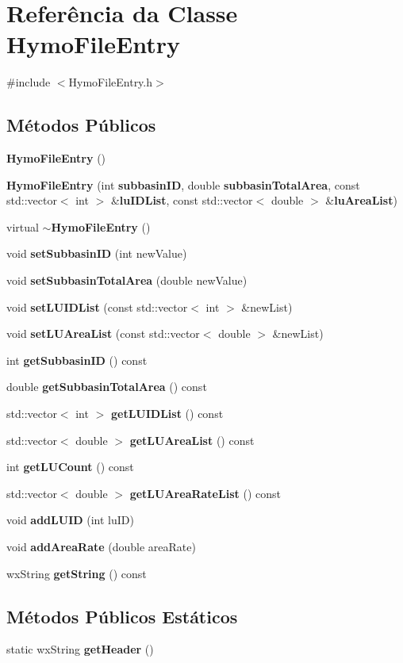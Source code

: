 \section{Referência da Classe Hymo\+File\+Entry}
\label{class_hymo_file_entry}


{\ttfamily \#include $<$Hymo\+File\+Entry.\+h$>$}

\subsection*{Métodos Públicos}
\begin{DoxyCompactItemize}
\item 
{\bf Hymo\+File\+Entry} ()
\item 
{\bf Hymo\+File\+Entry} (int {\bf subbasin\+ID}, double {\bf subbasin\+Total\+Area}, const std\+::vector$<$ int $>$ \&{\bf lu\+I\+D\+List}, const std\+::vector$<$ double $>$ \&{\bf lu\+Area\+List})
\item 
virtual {\bf $\sim$\+Hymo\+File\+Entry} ()
\item 
void {\bf set\+Subbasin\+ID} (int new\+Value)
\item 
void {\bf set\+Subbasin\+Total\+Area} (double new\+Value)
\item 
void {\bf set\+L\+U\+I\+D\+List} (const std\+::vector$<$ int $>$ \&new\+List)
\item 
void {\bf set\+L\+U\+Area\+List} (const std\+::vector$<$ double $>$ \&new\+List)
\item 
int {\bf get\+Subbasin\+ID} () const 
\item 
double {\bf get\+Subbasin\+Total\+Area} () const 
\item 
std\+::vector$<$ int $>$ {\bf get\+L\+U\+I\+D\+List} () const 
\item 
std\+::vector$<$ double $>$ {\bf get\+L\+U\+Area\+List} () const 
\item 
int {\bf get\+L\+U\+Count} () const 
\item 
std\+::vector$<$ double $>$ {\bf get\+L\+U\+Area\+Rate\+List} () const 
\item 
void {\bf add\+L\+U\+ID} (int lu\+ID)
\item 
void {\bf add\+Area\+Rate} (double area\+Rate)
\item 
wx\+String {\bf get\+String} () const 
\end{DoxyCompactItemize}
\subsection*{Métodos Públicos Estáticos}
\begin{DoxyCompactItemize}
\item 
static wx\+String {\bf get\+Header} ()
\end{DoxyCompactItemize}
